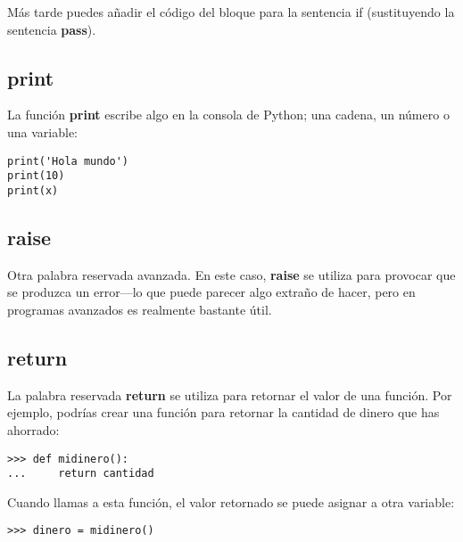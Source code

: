 \noindent
Más tarde puedes añadir el código del bloque para la sentencia if (sustituyendo la sentencia \textbf{pass}).

\subsection*{print}

La función \textbf{print} escribe algo en la consola de Python; una cadena, un número o una variable:

\begin{listing}
\begin{verbatim}
print('Hola mundo')
print(10)
print(x)
\end{verbatim}
\end{listing}

\subsection*{raise}

Otra palabra reservada avanzada.   En este caso, \textbf{raise} se utiliza para provocar que se produzca un error---lo que puede parecer algo extraño de hacer, pero en programas avanzados es realmente bastante útil.

\subsection*{return}

La palabra reservada \textbf{return} se utiliza para retornar el valor de una función.   Por ejemplo, podrías crear una función para retornar la cantidad de dinero que has ahorrado:

\begin{listingignore}
\begin{verbatim}
>>> def midinero():
...     return cantidad
\end{verbatim}
\end{listingignore}

\noindent
Cuando llamas a esta función, el valor retornado se puede asignar a otra variable:

\begin{listingignore}
\begin{verbatim}
>>> dinero = midinero()
\end{verbatim}
\end{listingignore}

